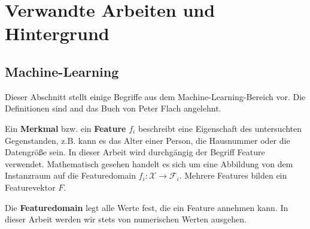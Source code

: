 
\section{Verwandte Arbeiten und Hintergrund}
	
\subsection{Machine-Learning}
Dieser Abschnitt stellt einige Begriffe aus dem Machine-Learning-Bereich vor. Die Definitionen sind and das Buch von Peter Flach \cite{Flach:2012:MLA:2490546} angelehnt.

Ein \textbf{Merkmal} bzw. ein \textbf{Feature} $f_i$ beschreibt eine Eigenschaft des untersuchten Gegenstanden, z.B. kann es das Alter einer Person, die Hausnummer oder die Datengröße sein. In dieser Arbeit wird durchgängig der Begriff Feature verwendet. Mathematisch gesehen handelt es sich um eine Abbildung von dem Instanzraum auf die Featuredomain $f_i : \mathscr{X} \rightarrow \mathscr{F}_i$. Mehrere Features bilden ein Featurevektor $F$. 

Die \textbf{Featuredomain} legt alle Werte fest, die ein Feature annehmen kann. In dieser Arbeit werden wir stets von numerischen Werten ausgehen.

